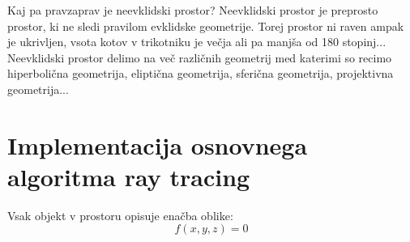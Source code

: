 \documentclass[titlepage]{article}
\begin{document}
Kaj pa pravzaprav je neevklidski prostor?
Neevklidski prostor je preprosto prostor, ki ne sledi pravilom evklidske geometrije. Torej prostor ni raven ampak je ukrivljen, vsota kotov v trikotniku je večja ali pa manjša od 180 stopinj... Neevklidski prostor delimo na več različnih geometrij med katerimi so recimo hiperbolična geometrija, eliptična geometrija, sferična geometrija, projektivna geometrija...

\section{Implementacija osnovnega algoritma ray tracing}
Vsak objekt v prostoru opisuje enačba oblike:
\begin{equation}
    f(x,y,z)=0
\end{equation}
\end{document}
